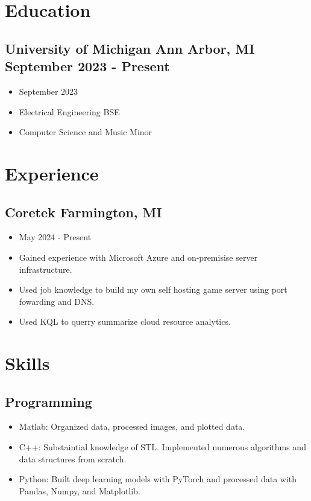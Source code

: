 \documentclass{article}
\begin{document}
\section*{Education}
\subsection*{University of Michigan  Ann Arbor, MI  September 2023 - Present}
\begin{itemize}
	\item September 2023
	\item Electrical Engineering BSE
	\item Computer Science and Music Minor
\end{itemize}

\section*{Experience}
\subsection*{Coretek Farmington, MI}
\begin{itemize}
	\item May 2024 - Present
	\item Gained experience with Microsoft Azure and on-premisise server infrastructure.
	\item Used job knowledge to build my own self hosting game server using port fowarding and DNS.
	\item Used KQL to querry summarize cloud resource analytics.
\end{itemize}

\section*{Skills}
\subsection*{Programming}
\begin{itemize}
	\item Matlab: Organized data, processed images, and plotted data.
	\item C++: Substaintial knowledge of STL. Implemented numerous algorithms and data structures from scratch.
	\item Python: Built deep learning models with PyTorch and processed data with Pandas, Numpy, and Matplotlib.
\end{itemize}
\end{document}
